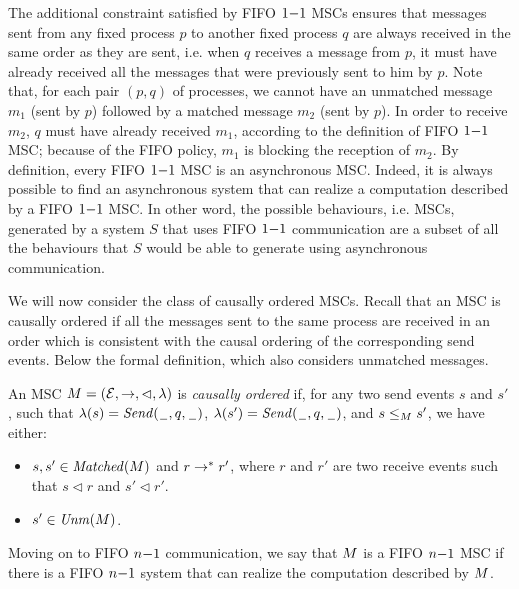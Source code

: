 The additional constraint satisfied by FIFO $1\mathsf{-}1$ MSCs ensures that messages sent from any fixed process $p$ to another fixed process $q$ are always received in the same order as they are sent, i.e. when $q$ receives a message from $p$, it must have already received all the messages that were previously sent to him by $p$. Note that, for each pair $(p,q)$ of processes, we cannot have an unmatched message $m_1$ (sent by $p$) followed by a matched message $m_2$ (sent by $p$). In order to receive $m_2$, $q$ must have already received $m_1$, according to the definition of FIFO $1\mathsf{-}1$ MSC; because of the FIFO policy, $m_1$ is blocking the reception of $m_2$. By definition, every FIFO $1\mathsf{-}1$ MSC is an asynchronous MSC. Indeed, it is always possible to find an asynchronous system that can realize a computation described by a FIFO $1\mathsf{-}1$ MSC. In other word, the possible behaviours, i.e. MSCs, generated by a system $S$ that uses FIFO $1\mathsf{-}1$ communication are a subset of all the behaviours that $S$ would be able to generate using asynchronous communication.

\medskip

We will now consider the class of causally ordered MSCs. Recall that an MSC is causally ordered if all the messages sent to the same process are received in an order which is consistent with the causal ordering of the corresponding send events. Below the formal definition, which also considers unmatched messages.

\begin{definition}
An MSC $M = (\mathcal{E},\to,\lhd,\lambda)$ is \emph{causally ordered} if, for any two send events $s$ and $s'$, such that $\lambda(s)={\mathit{Send}(\hspace{0.1em}\underline{\hspace{0.5em}}\hspace{0.1em},q,\hspace{0.1em}\underline{\hspace{0.5em}}\hspace{0.1em})}$, $\lambda(s')={\mathit{Send}(\hspace{0.1em}\underline{\hspace{0.5em}}\hspace{0.1em},q,\hspace{0.1em}\underline{\hspace{0.5em}}\hspace{0.1em})}$, and $s \le_M s'$, we have either:
\begin{itemize}\itemsep=0.5ex
	\item $s,s' \in \mathit{Matched}(M)$ and $r \to^* r'$, where $r$ and $r'$ are two receive events such that $s \lhd r$ and $s' \lhd r'$.
	\item $s' \in \mathit{Unm}(M)$.
\end{itemize}
\end{definition}


Moving on to FIFO $n\mathsf{-}1$ communication, we say that $M$ is a FIFO $n\mathsf{-}1$ MSC if there is a FIFO $n\mathsf{-}1$ system that can realize the computation described by $M$.

